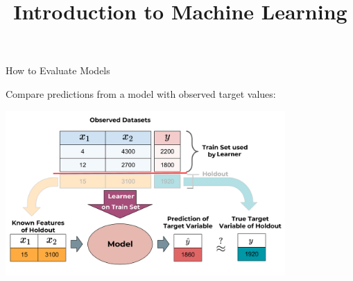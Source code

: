 \documentclass[11pt,compress,t,notes=noshow, xcolor=table]{beamer}
\title{Introduction to Machine Learning}
\institute{\href{https://compstat-lmu.github.io/lecture_i2ml/}{compstat-lmu.github.io/lecture\_i2ml}}
\date{}
\begin{document}
















\begin{frame}{How to Evaluate Models}

Compare predictions from a model with observed target values:

\scriptsize

\begin{center}\includegraphics[width=0.8\textwidth]{figure_man/eval_inducer1_web} \end{center}
\lz\lz
\end{frame}
\end{document}
